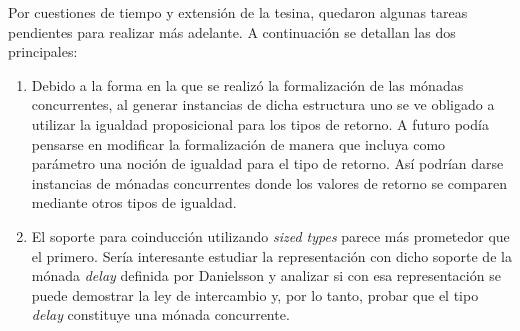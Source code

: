 Por cuestiones de tiempo y extensión de la tesina, quedaron algunas tareas pendientes para realizar más adelante. A continuación se detallan las dos principales:
\begin{enumerate}
\item Debido a la forma en la que se realizó la formalización de las mónadas concurrentes, al generar instancias de dicha estructura uno se ve obligado a utilizar la igualdad proposicional para los tipos de retorno. A futuro podía pensarse en modificar la formalización de manera que incluya como parámetro una noción de igualdad para el tipo de retorno. Así podrían darse instancias de mónadas concurrentes donde los valores de retorno se comparen mediante otros tipos de igualdad.

\item El soporte para coinducción utilizando \textit{sized types} parece más prometedor que el primero. Sería interesante estudiar la representación con dicho soporte de la mónada \textit{delay} definida por Danielsson \cite{danielsson:2017} y analizar si con esa representación se puede demostrar la ley de intercambio y, por lo tanto, probar que el tipo \textit{delay} constituye una mónada concurrente. 
\end{enumerate}